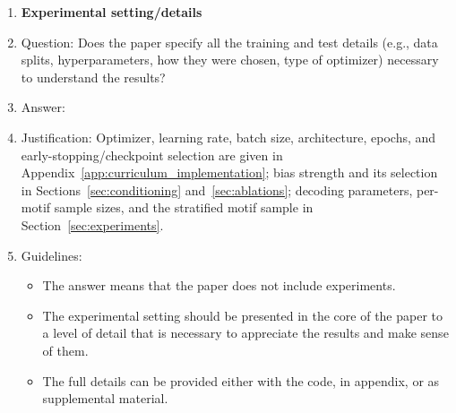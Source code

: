 \documentclass{article}
\begin{document}
\begin{enumerate}
\item {\bf Experimental setting/details}
    \item[] Question: Does the paper specify all the training and test details (e.g., data splits, hyperparameters, how they were chosen, type of optimizer) necessary to understand the results?
    \item[] Answer: \answerYes{}
    \item[] Justification: Optimizer, learning rate, batch size, architecture, epochs, and early-stopping/checkpoint selection are given in Appendix~\ref{app:curriculum_implementation}; bias strength and its selection in Sections~\ref{sec:conditioning} and~\ref{sec:ablations}; decoding parameters, per-motif sample sizes, and the stratified motif sample in Section~\ref{sec:experiments}.
    \item[] Guidelines:
    \begin{itemize}
        \item The answer \answerNA{} means that the paper does not include experiments.
        \item The experimental setting should be presented in the core of the paper to a level of detail that is necessary to appreciate the results and make sense of them.
        \item The full details can be provided either with the code, in appendix, or as supplemental material.
    \end{itemize}


\end{enumerate}
\end{document}

